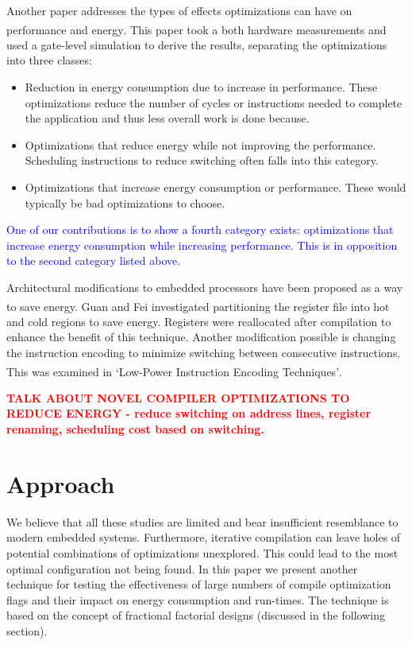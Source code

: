 \documentclass[twocolumn]{article}
\newcommand{\todo}[1]{\textbf{\textcolor{red}{#1}}}
\let\oldcite\cite
\renewcommand{\cite}[1]{\textsuperscript{\oldcite{#1}}}
\begin{document}
Another paper addresses the types of effects optimizations can have on performance and energy\cite{WhatCanAPoorCompilerDo}. This paper took a both hardware measurements and used a gate-level simulation to derive the results,  separating the optimizations into three classes:
\begin{itemize}
	\setlength{\itemsep}{0em}
	\vspace{-1mm}
	\item Reduction in energy consumption due to increase in performance. These optimizations reduce the number of cycles or instructions needed to complete the application and thus less overall work is done because.
	\item Optimizations that reduce energy while not improving the performance. Scheduling instructions to reduce switching often falls into this category.
	\item Optimizations that increase energy consumption or performance. These would typically be bad optimizations to choose.
\end{itemize}

\textcolor{blue}{One of our contributions is to show a fourth category exists: optimizations that increase energy consumption while increasing performance. This is in opposition to the second category listed above.}

Architectural modifications to embedded processors have been proposed as a way to save energy. Guan and Fei investigated partitioning the register file\cite{RegisterFilePartitioning} into hot and cold regions to save energy. Registers were reallocated after compilation to enhance the benefit of this technique. Another modification possible is changing the instruction encoding to minimize switching between consecutive instructions. This was examined in `Low-Power Instruction Encoding Techniques'\cite{LowPowerInstructionEncodings}.

\todo{TALK ABOUT NOVEL COMPILER OPTIMIZATIONS TO REDUCE ENERGY - reduce switching on address lines, register renaming, scheduling cost based on switching.}


\section*{Approach}

We believe that all these studies are limited and bear insufficient resemblance to modern embedded systems. Furthermore, iterative compilation can leave holes of potential combinations of optimizations unexplored. This could lead to the most optimal configuration not being found. In this paper we present another technique for testing the effectiveness of large numbers of compile optimization flags and their impact on energy consumption and run-times. The technique is based on the concept of fractional factorial designs (discussed in the following section).
\end{document}
